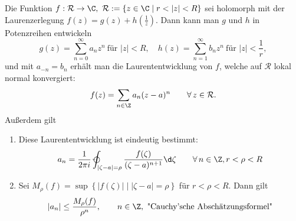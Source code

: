 		\begin{thmn}[Laurententwicklung]\label{3.3.4}
			Die Funktion $ f: \mathcal{R} \to \C,\ \mathcal{R} := \{z \in \C \mid r < |z| < R\} $ sei holomorph mit der Laurenzerlegung $f(z) = g(z) + h\left(\frac{1}{z}\right)$. Dann kann man $g$ und $h$ in Potenzreihen entwickeln
			\[ g(z) = \sum_{n=0}^\infty a_n z^n\ \text{für } |z| < R,\quad h(z) = \sum_{n=1}^\infty b_n z^n\ \text{für } |z| < \frac{1}{r}, \] und mit $a_{-n} = b_n$ erhält man die Laurententwicklung von $f$, welche auf $\mathcal{R}$ lokal normal konvergiert: 
			\[ f(z) = \sum_{n \in \Z} a_n (z-a)^n \qquad \forall\, z \in \mathcal{R}. \]
			Außerdem gilt
			\begin{enumerate}[label={\roman*})]
				\item Diese Laurententwicklung ist eindeutig bestimmt:
				\[ a_n = \frac{1}{2\pi i} \varointctrclockwise_{|\zeta - a| = \rho} \frac{f(\zeta)}{(\zeta - a)^{n+1}}\d\zeta \qquad \forall\, n \in \Z, r < \rho < R \]
				\item Sei $ M_\rho (f) = \sup \left\{|f(\zeta)| \mid |\zeta-a| = \rho \right\} $ für $ r < \rho < R. $ Dann gilt 
				\[ |a_n| \leq \frac{M_\rho(f)}{\rho^n}, \qquad n \in \Z,\ \text{"Cauchy'sche Abschätzungsformel"} \]
			\end{enumerate}
		\end{thmn}
